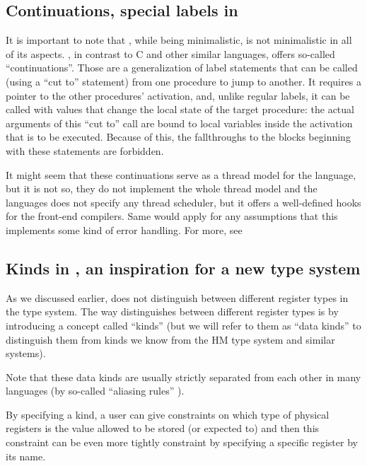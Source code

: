 \subsection{Continuations, special labels in \cmm{}}

It is important to note that \cmm{}, while being minimalistic, is not minimalistic in all of its aspects. \cmm{}, in contrast to C and other similar languages, offers so-called ``continuations''. Those are a generalization of label statements that can be called (using a ``cut to'' statement) from one procedure to jump to another. It requires a pointer to the other procedures' activation, and, unlike regular labels, it can be called with values that change the local state of the target procedure: the actual arguments of this ``cut to'' call are bound to local variables inside the activation that is to be executed. Because of this, the fallthroughs to the blocks beginning with these statements are forbidden.

It might seem that these continuations serve as a thread model for the language, but it is not so, they do not implement the whole thread model and the languages does not specify any thread scheduler, but it offers a well-defined hooks for the front-end compilers. Same would apply for any assumptions that this implements some kind of error handling. For more, see \cite{ramsey2005c}

\subsection{Kinds in \cmm{}, an inspiration for a new type system}

As we discussed earlier, \cmm{} does not distinguish between different register types in the type system. The way \cmm{} distinguishes between different register types is by introducing a concept called ``kinds'' (but we will refer to them as ``data kinds'' to distinguish them from kinds we know from the HM type system and similar systems).

Note that these data kinds are usually strictly separated from each other in many languages (by so-called ``aliasing rules'' ).

By specifying a kind, a user can give constraints on which type of physical registers is the value allowed to be stored (or expected to) and then this constraint can be even more tightly constraint by specifying a specific register by its name.

